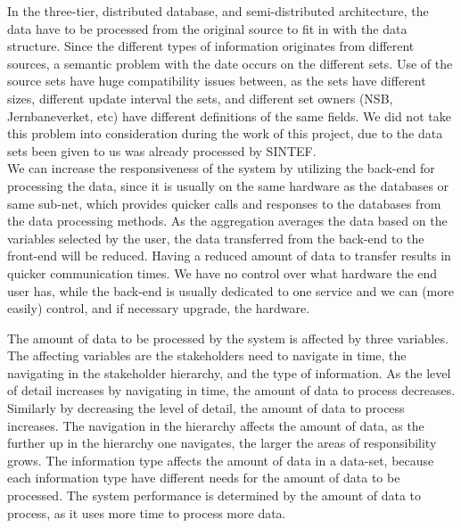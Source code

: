 In the three-tier, distributed database, 
and semi-distributed architecture, the data have to be processed from the 
original source to fit in with the data structure. Since the different types of
information originates from different sources, a semantic problem with the date
occurs on the different sets. Use of the source sets have huge compatibility 
issues between, as the sets have different sizes, different update interval
the sets, and different set owners (NSB, Jernbaneverket, etc) have different
definitions of the same fields. We did not take this problem into consideration
during the work of this project, due to the data sets been given to us was 
already processed by SINTEF. 
\\

We can increase the responsiveness of the system by utilizing the back-end for 
processing the data, since it is usually on the same hardware as the databases or 
same sub-net, which provides quicker calls and responses to the databases from 
the data processing methods. As the aggregation averages the data based on the 
variables selected by the user, the data transferred from the back-end to the 
front-end will be reduced. Having a reduced amount of data to transfer results 
in quicker communication times. We 
have no control over what hardware the end user has, while the back-end 
is usually dedicated to one service and we can (more easily) control, and if 
necessary upgrade, the hardware.

The amount of data to be processed by the system is affected by three 
variables. The affecting variables are the stakeholders need to navigate in 
time, the navigating in the stakeholder hierarchy, and the type of information.
As the level of detail increases by navigating in time, the amount of data to 
process decreases. Similarly by decreasing the level of detail, the amount of 
data to process increases. The navigation in the hierarchy affects the amount 
of data, as the further up in the hierarchy one navigates, the larger the 
areas of responsibility grows. The information type affects the amount of data 
in a data-set, because each information type have different needs for the 
amount of data to be processed. The system performance is determined by the 
amount of data to process, as it uses more time to process more data. 

